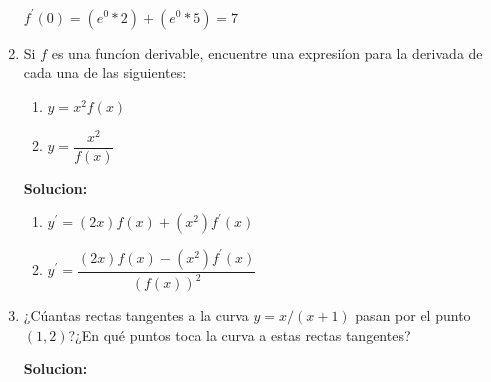 \documentclass{article}
\begin{document}
\begin{enumerate}[start=5, label=\textbf{\arabic*.}]
    $f^{\prime}(0) =  (e^0*2) + (e^0*5) = 7$
    \vspace{0.5em}
    \item Si $f$ es una funcíon derivable, encuentre una expresiíon para la derivada de cada una de las siguientes:
    \begin{enumerate}[label=\alph*)]
        \item $y = x^2f(x)$
        \item $y = \dfrac{x^2}{f(x)}$
    \end{enumerate}

    \textbf{Solucion: }
    \begin{enumerate}[label=\alph*)]
        \item $y^{\prime} = (2x)f(x) + (x^2)f^{\prime}(x)$
        \item $y^{\prime} = \dfrac{(2x)f(x) - (x^2)f^{\prime}(x)}{(f(x))^2}$
    \end{enumerate}
    \vspace{0.5em}
    
    \item ¿Cúantas rectas tangentes a la curva $y = x/(x+1)$ pasan por el punto $(1,2)$?¿En qué puntos toca la curva a estas rectas tangentes?
    
    \vspace{0.5em}
    \textbf{Solucion: } 


\end{enumerate}
\end{document}
